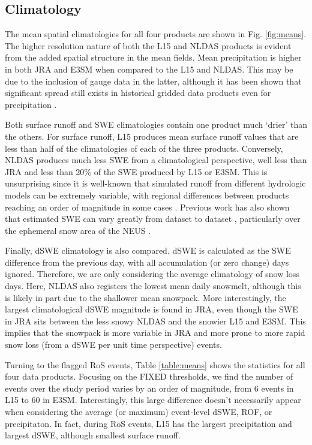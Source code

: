 \documentclass[draft]{agujournal2019}
\begin{document}
\subsection{Climatology}

The mean spatial climatologies for all four products are shown in Fig. \ref{fig:means}. The higher resolution nature of both the L15 and NLDAS products is evident from the added spatial structure in the mean fields. Mean precipitation is higher in both JRA and E3SM when compared to the L15 and NLDAS. This may be due to the inclusion of gauge data in the latter, although it has been shown that significant spread still exists in historical gridded data products even for precipitation \citep{gutmann2012comparison,livneh2014filling}.

Both surface runoff and SWE climatologies contain one product much `drier' than the others. For surface runoff, L15 produces mean surface runoff values that are less than half of the climatologies of each of the three products. Conversely, NLDAS produces much less SWE from a climatological perspective, well less than JRA and less than 20\% of the SWE produced by L15 or E3SM. This is unsurprising since it is well-known that simulated runoff from different hydrologic models can be extremely variable, with regional differences between products reaching an order of magnitude in some cases \citep{gudmundsson2012comparing,sood2015global,beck2017global}. Previous work has also shown that estimated SWE can vary greatly from dataset to dataset \citep{lundquist2015high}, particularly over the ephemeral snow area of the NEUS \citep{mccrary2017evaluation}.

Finally, dSWE climatology is also compared. dSWE is calculated as the SWE difference from the previous day, with all accumulation (or zero change) days ignored. Therefore, we are only considering the average climatology of snow loss days. Here, NLDAS also registers the lowest mean daily snowmelt, although this is likely in part due to the shallower mean snowpack. More interestingly, the largest climatological dSWE magnitude is found in JRA, even though the SWE in JRA sits between the less snowy NLDAS and the snowier L15 and E3SM. This implies that the snowpack is more variable in JRA and more prone to more rapid snow loss (from a dSWE per unit time perspective) events.

Turning to the flagged RoS events, Table \ref{table:means} shows the statistics for all four data products. Focusing on the FIXED thresholds, we find the number of events over the study period varies by an order of magnitude, from 6 events in L15 to 60 in E3SM. Interestingly, this large difference doesn't necessarily appear when considering the average (or maximum) event-level dSWE, ROF, or precipitaton. In fact, during RoS events, L15 has the largest precipitation and largest dSWE, although smallest surface runoff.
\end{document}
